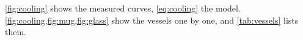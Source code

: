 \cref{fig:cooling} shows the measured curves, \cref{eq:cooling} the model.
\cref{fig:cooling,fig:mug,fig:glass} show the vessels one by one,
and \cref{tab:vessels} lists them.
